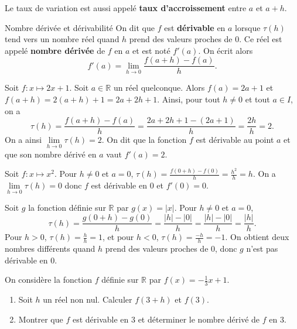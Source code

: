 \documentclass[11pt]{article}
\begin{document}
\begin{rmq}
  Le taux de variation est aussi appelé \textbf{taux d'accroissement} entre $a$
  et $a+h$.
\end{rmq}

\begin{defi}{Nombre dérivée et dérivabilité}
  On dit que $f$ est \textbf{dérivable} en $a$ lorsque $\tau(h)$ tend vers un
  nombre réel quand $h$ prend des valeurs proches de $0$. Ce réel est appelé
  \textbf{nombre dérivée} de $f$ en $a$ et est noté $f'(a)$. On écrit alors
  \[
    f'(a) = \underset{h\to0}{\lim}\frac{f(a+h)-f(a)}{h}.
  \]
\end{defi}

\begin{exemple}
  Soit $f:x\mapsto 2x+1$. Soit $a\in\mathbb{R}$ un réel quelconque. Alors
  $f(a)=2a+1$ et $f(a+h)=2(a+h)+1=2a+2h+1$. Ainsi,
  pour tout $h\neq0$ et tout $a\in I$, on a
  \[
    \tau(h) = \frac{f(a+h)-f(a)}{h} = \frac{2a+2h+1-(2a+1)}{h} =
    \frac{2h}{h}=2.
  \]
  On a ainsi $\underset{h\to0}{\lim}\tau(h)=2$. On dit que la fonction $f$ est
  dérivable au point $a$ et que son nombre dérivé en $a$ vaut $f'(a)=2$.
\end{exemple}

\begin{exemple}
  Soit $f:x\mapsto x^2$. Pour $h\neq0$ et $a=0$,
  $\tau(h)=\frac{f(0+h)-f(0)}{h}=\frac{h^2}{h}=h$. On a
  $\underset{h\to0}{\lim}\tau(h)=0$ donc $f$ est dérivable en $0$ et $f'(0)=0$.
\end{exemple}

\begin{exemple}
  \begin{minipage}{.7\textwidth}
  Soit $g$ la fonction définie sur $\mathbb{R}$ par $g(x)=|x|$. Pour $h\neq0$ et
  $a=0$,
  \[
    \tau(h)=\frac{g(0+h)-g(0)}{h}=\frac{|h|-|0|}{h}=\frac{|h|-|0|}{h}=\frac{|h|}{h}.
  \]
  Pour $h>0$, $\tau(h)=\frac{h}{h}=1$, et pour $h<0$,
  $\tau(h)=\frac{-h}{h}=-1$. On obtient deux nombres différents quand $h$ prend
  des valeurs proches de $0$, donc $g$ n'est pas dérivable en $0$.
\end{minipage}
  \begin{minipage}{.3\textwidth}
  \begin{center}
  \end{center}
\end{minipage}
\end{exemple}
\begin{app}
  On considère la fonction $f$ définie sur $\mathbb{R}$ par
  $f(x)=-\frac{1}{3}x+1$.
  \begin{enumerate}
    \item Soit $h$ un réel non nul. Calculer $f(3+h)$ et $f(3)$.
    \item Montrer que $f$ est dérivable en $3$ et déterminer le nombre dérivé de
      $f$ en $3$.
  \end{enumerate}
\end{app}
\end{document}
